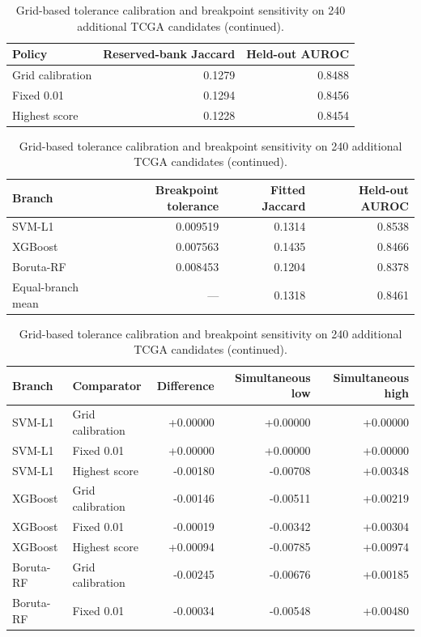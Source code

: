 \begin{table}[p]
\ContinuedFloat
\centering
\caption{Grid-based tolerance calibration and breakpoint sensitivity on 240 additional TCGA candidates (continued).}
\small
\renewcommand{\arraystretch}{1.10}
\setlength{\tabcolsep}{4pt}
\begin{tabular}{lrr}
\toprule
Policy & Reserved-bank Jaccard & Held-out AUROC \\
\midrule
Grid calibration & 0.1279 & 0.8488 \\
Fixed 0.01 & 0.1294 & 0.8456 \\
Highest score & 0.1228 & 0.8454 \\
\bottomrule
\end{tabular}
\par\medskip
{}
\begin{tabular}{lrrr}
\toprule
Branch & Breakpoint tolerance & Fitted Jaccard & Held-out AUROC \\
\midrule
SVM-L1 & 0.009519 & 0.1314 & 0.8538 \\
XGBoost & 0.007563 & 0.1435 & 0.8466 \\
Boruta-RF & 0.008453 & 0.1204 & 0.8378 \\
Equal-branch mean & --- & 0.1318 & 0.8461 \\
\bottomrule
\end{tabular}
\par\medskip
{}
\begin{tabular}{llrrr}
\toprule
Branch & Comparator & Difference & Simultaneous low & Simultaneous high \\
\midrule
SVM-L1 & Grid calibration & +0.00000 & +0.00000 & +0.00000 \\
SVM-L1 & Fixed 0.01 & +0.00000 & +0.00000 & +0.00000 \\
SVM-L1 & Highest score & -0.00180 & -0.00708 & +0.00348 \\
XGBoost & Grid calibration & -0.00146 & -0.00511 & +0.00219 \\
XGBoost & Fixed 0.01 & -0.00019 & -0.00342 & +0.00304 \\
XGBoost & Highest score & +0.00094 & -0.00785 & +0.00974 \\
Boruta-RF & Grid calibration & -0.00245 & -0.00676 & +0.00185 \\
Boruta-RF & Fixed 0.01 & -0.00034 & -0.00548 & +0.00480 \\

\end{tabular}
\end{table}
